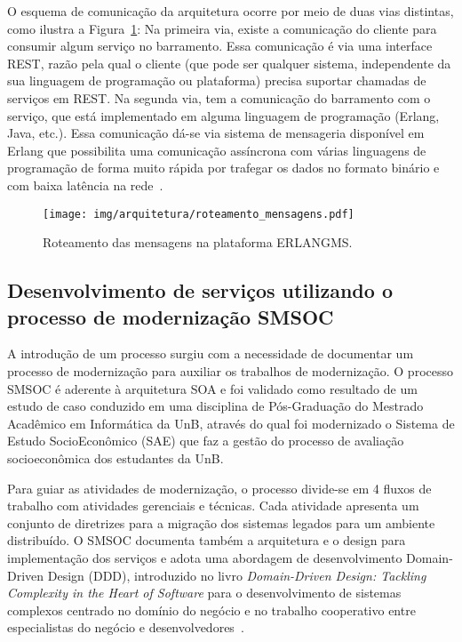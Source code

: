 \documentclass[12pt]{article}
\begin{document}
O esquema de comunicação da arquitetura ocorre por meio de 
duas vias distintas, como ilustra a Figura~\ref{fig:roteamento_mensagens}: Na primeira via, 
existe a comunicação do cliente para 
consumir algum serviço no barramento. Essa comunicação é via uma 
interface REST, razão pela qual o cliente (que pode ser qualquer sistema, 
independente da sua linguagem de programação ou plataforma) 
precisa suportar chamadas de serviços em REST. Na segunda via, tem a comunicação 
do barramento com o serviço, que está implementado em 
alguma linguagem de programação (Erlang, Java, etc.). Essa comunicação dá-se via
sistema de mensageria disponível em Erlang que possibilita uma comunicação assíncrona 
com várias linguagens de programação de forma muito rápida por trafegar os dados 
no formato binário e com baixa latência na rede~\cite{Armstrong:2013:PES:2566708}.

\begin{figure}[htb]
\centering
\texttt{[image: img/arquitetura/roteamento\_mensagens.pdf]}
\caption{Roteamento das mensagens na plataforma ERLANGMS.}
\label{fig:roteamento_mensagens}
\end{figure}






\subsection{Desenvolvimento de serviços utilizando o processo de modernização SMSOC}\label{smsoc}

A introdução de um processo surgiu com a necessidade
de documentar um processo de modernização 
para auxiliar os trabalhos de modernização.
O processo SMSOC é 
aderente à arquitetura SOA 
e foi validado como  
resultado de um estudo de caso
conduzido em uma disciplina de Pós-Graduação
do Mestrado Acadêmico em Informática da UnB,
através do qual foi modernizado 
o Sistema de Estudo SocioEconômico (SAE)
que faz a gestão do processo de 
avaliação socioeconômica dos estudantes da UnB.

Para guiar as atividades de modernização, o processo 
divide-se em 4 fluxos de trabalho com atividades gerenciais e técnicas. Cada
atividade apresenta um conjunto de diretrizes para
a migração dos sistemas legados para um ambiente distribuído. 
O SMSOC documenta também a arquitetura e o design
para implementação dos serviços e adota uma 
abordagem de desenvolvimento Domain-Driven
Design (DDD), introduzido no livro \textit{Domain-Driven Design: Tackling Complexity in the
Heart of Software} para o desenvolvimento de sistemas complexos centrado no domínio
do negócio e no trabalho cooperativo entre especialistas do negócio e desenvolvedores~\cite{evans2004domain}.
\end{document}
